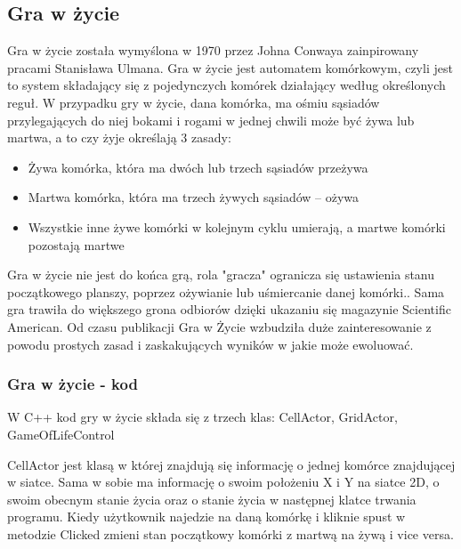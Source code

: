 \documentclass[a4paper,12pt,reqno]{article}
\begin{document}
\newpage
\subsection{Gra w życie}

{\color{blue}
Gra w życie została wymyślona w 1970 przez Johna Conwaya zainpirowany pracami Stanisława Ulmana. Gra w życie jest automatem komórkowym, czyli jest to system składający się z pojedynczych komórek działający według określonych reguł.\cite{game_of_life} W przypadku gry w życie, dana komórka, ma ośmiu sąsiadów przylegających do niej bokami i rogami w jednej chwili może być żywa lub martwa, a to czy żyje określają 3 zasady:

\begin{itemize}
\item Żywa komórka, która ma dwóch lub trzech sąsiadów przeżywa
\item Martwa komórka, która ma trzech żywych sąsiadów – ożywa
\item Wszystkie inne żywe komórki w kolejnym cyklu umierają, a martwe komórki pozostają martwe
\end{itemize}

Gra w życie nie jest do końca grą, rola "gracza" ogranicza się ustawienia stanu początkowego planszy, poprzez ożywianie lub uśmiercanie danej komórki.\cite{game_of_life_wiki}. Sama gra trawiła do większego grona odbiorów dzięki ukazaniu się magazynie Scientific American. Od czasu publikacji Gra w Życie wzbudziła duże zainteresowanie z powodu prostych zasad i zaskakujących wyników w jakie może ewoluować.

}
\subsubsection{Gra w życie - kod}

W C++ kod gry w życie składa się z trzech klas: CellActor, GridActor, GameOfLifeControl

CellActor jest klasą w której znajdują się informację o jednej komórce znajdującej w siatce. Sama w sobie ma informację o swoim położeniu X i Y na siatce 2D, o swoim obecnym stanie życia oraz o stanie życia w następnej klatce trwania programu. 
Kiedy użytkownik najedzie na daną komórkę i kliknie spust w metodzie Clicked zmieni stan początkowy komórki z martwą na żywą i vice versa.


\end{document}

